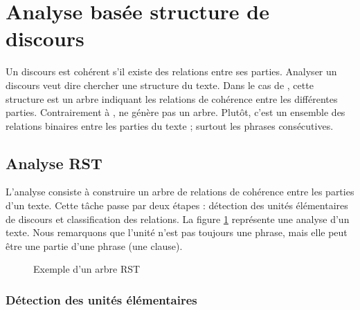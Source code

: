 \documentclass{KodeBook}
\begin{document}



\section{Analyse basée structure de discours}

Un discours est cohérent s'il existe des relations entre ses parties. 
Analyser un discours veut dire chercher une structure du texte.
Dans le cas de , cette structure est un arbre indiquant les relations de cohérence entre les différentes parties. 
Contrairement à ,  ne génère pas un arbre.
Plutôt, c'est un ensemble des relations binaires entre les parties du texte ; surtout les phrases consécutives. 


\subsection{Analyse RST}

L'analyse  consiste à construire un arbre de relations de cohérence entre les parties d'un texte. 
Cette tâche passe par deux étapes : détection des unités élémentaires de discours et classification des relations. 
La figure \ref{fig:rst-exp} représente une analyse  d'un texte.
Nous remarquons que l'unité n'est pas toujours une phrase, mais elle peut être une partie d'une phrase (une clause).

\begin{figure}[!ht]
	\centering
	\caption{Exemple d'un arbre RST}
	\label{fig:rst-exp}
\end{figure}

\subsubsection{Détection des unités élémentaires}
\end{document}
